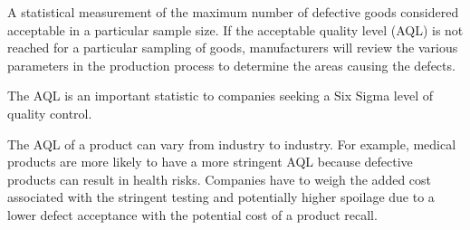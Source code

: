\documentclass[12pts]{article}
\begin{document}
A statistical measurement of the maximum number of defective goods considered acceptable in a particular sample size. If the acceptable quality level (AQL) is not reached for a particular sampling of goods, manufacturers will review the various parameters in the production process to determine the areas causing the defects.

The AQL is an important statistic to companies seeking a Six Sigma level of quality control.

The AQL of a product can vary from industry to industry. For example, medical products are more likely to have a more stringent AQL because defective products can result in health risks. Companies have to weigh the added cost associated with the stringent testing and potentially higher spoilage due to a lower defect acceptance with the potential cost of a product recall.
\end{document}
